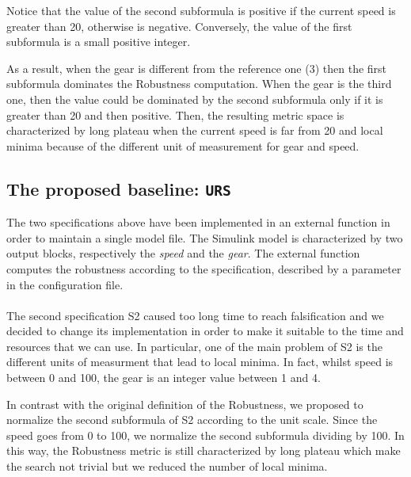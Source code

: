 \documentclass[11pt]{article}
\begin{document}
Notice that the value of the second subformula is positive if the current speed is greater than 20, otherwise is negative. Conversely, the value of the first subformula is a small positive integer.

As a result, when the gear is different from the reference one (3) then the first subformula dominates the Robustness computation. When the gear is the third one, then the value could be dominated by     the second subformula only if it is greater than 20 and then positive. Then, the resulting metric space is characterized by long plateau when the current speed is far from 20 and local minima because of  the different unit of measurement for gear and speed.

\subsection{The proposed baseline: \texttt{URS}}
The two specifications above have been implemented in an external function in order to maintain a single model file. The Simulink model is characterized by two output blocks, respectively the \textit{speed} and the \textit{gear}. The external function computes the robustness according to the specification, described by a parameter in the configuration file.
\\ \\
The second specification S2 caused too long time to reach falsification and we decided to change its implementation in order to make it suitable to the time and resources that we can use. In particular, one of the main problem of S2 is the different units of measurment that lead to local minima. In fact, whilst speed is between 0 and 100, the gear is an integer value between 1 and 4.

In contrast with the original definition of the Robustness, we proposed to normalize the second subformula of S2 according to the unit scale. Since the speed goes from 0 to 100, we normalize the second subformula dividing by 100. In this way, the Robustness metric is still characterized by long plateau which make the search not trivial but we reduced the number of local minima.
\end{document}
